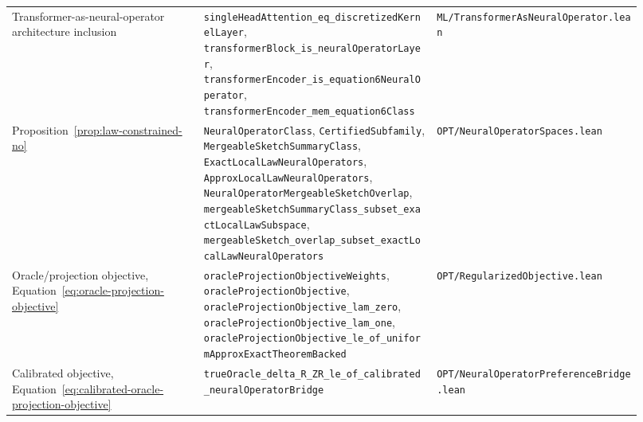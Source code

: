 {\begin{longtable}{p{0.28\linewidth}p{0.34\linewidth}p{0.30\linewidth}}
Transformer-as-neural-operator architecture inclusion &
\texttt{singleHeadAttention\_eq\_discretizedKernelLayer}, \texttt{transformerBlock\_is\_neuralOperatorLayer}, \texttt{transformerEncoder\_is\_equation6NeuralOperator}, \texttt{transformerEncoder\_mem\_equation6Class} &
\texttt{ML/TransformerAsNeuralOperator.lean} \\

Proposition~\ref{prop:law-constrained-no} &
\texttt{NeuralOperatorClass}, \texttt{CertifiedSubfamily}, \texttt{MergeableSketchSummaryClass}, \texttt{ExactLocalLawNeuralOperators}, \texttt{ApproxLocalLawNeuralOperators}, \texttt{NeuralOperatorMergeableSketchOverlap}, \texttt{mergeableSketchSummaryClass\_subset\_exactLocalLawSubspace}, \texttt{mergeableSketch\_overlap\_subset\_exactLocalLawNeuralOperators} &
\texttt{OPT/NeuralOperatorSpaces.lean} \\

Oracle/projection objective, Equation~\eqref{eq:oracle-projection-objective} &
\texttt{oracleProjectionObjectiveWeights}, \texttt{oracleProjectionObjective}, \texttt{oracleProjectionObjective\_lam\_zero}, \texttt{oracleProjectionObjective\_lam\_one}, \texttt{oracleProjectionObjective\_le\_of\_uniformApproxExactTheoremBacked} &
\texttt{OPT/RegularizedObjective.lean} \\

Calibrated objective, Equation~\eqref{eq:calibrated-oracle-projection-objective} &
\nolinkurl{trueOracle_delta_R_ZR_le_of_calibrated_neuralOperatorBridge} &
\texttt{OPT/NeuralOperatorPreferenceBridge.lean} \\


\end{longtable}}
